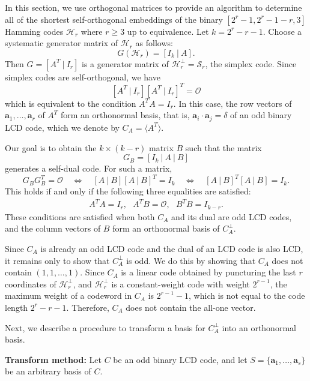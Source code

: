 \documentclass{article}
\theoremstyle{definition}
\theoremstyle{remark}
\begin{document}
In this section, we use orthogonal matrices to provide an algorithm to determine all of the shortest self-orthogonal embeddings of the binary $[2^r-1, 2^r-1-r,3]$ Hamming codes $\mathcal{H}_r$ where $r\ge 3$ up to equivalence.  Let $k=2^r-r-1$. Choose a systematic generator matrix of $\mathcal{H}_r$ as follows:
\[
G(\mathcal{H}_r)=[I_k~|~A].
\]
Then $ G = [A^T~|~ I_r]$ is a generator matrix of $\mathcal{H}_r^\perp = \mathcal{S}_r$, the simplex code.
Since simplex codes are self-orthogonal, we have
\[
  [A^T~|~ I_r][A^T~|~ I_r]^T=\mathcal{O}
\]
which is equivalent to the condition $A^TA=I_r$. In this case, the row vectors of $\mathbf{a}_1, \ldots, \mathbf{a}_r$ of $A^T$ form an orthonormal basis, that is, $\mathbf{a}_i\cdot\mathbf{a}_j=\delta$ of an odd binary LCD code, which we denote by $C_A=\langle A^T\rangle$.

Our goal is to obtain the $k\times (k-r)$ matrix $B$ such that the matrix
\begin{equation}\label{gen-mat-emb}
G_B=[I_k~|~A~|~B]
\end{equation}
generates a self-dual code. For such a matrix,
\[
  G_BG_B^T=\mathcal{O} \quad\Longleftrightarrow\quad [A~|~B][A~|~B]^T = I_k
  \quad\Longleftrightarrow\quad [A~|~B]^T[A~|~B]= I_k.
\]
This holds if and only if the following three equalities are satisfied:
\begin{align}\label{con-B}
  A^TA=I_r, \ \ \ A^T B=\mathcal{O}, \ \ \ B^T B=I_{k-r}.
\end{align}
These conditions are satisfied when both $C_A$ and its dual are odd LCD codes, and
the column vectors of $B$ form an orthonormal basis of $C_A^{\perp}$.

Since $C_A$ is already an odd LCD code and the dual of an LCD code is also LCD, it remains only to show that $C_A^\perp$ is odd. We do this by showing that $C_A$ does not contain $(1,1,\ldots, 1)$.  Since $C_A$ is a linear code obtained by puncturing the last $r$ coordinates of $\mathcal{H}_r^\perp$, and $\mathcal{H}_r^\perp$ is a constant-weight code with weight $2^{r-1}$, the maximum weight of a codeword in $C_A$ is $2^{r-1}-1$, which is not equal to the code length $2^r-r-1$.  Therefore, $C_A$ does not contain the all-one vector.

Next, we describe a procedure to transform a basis for $C_A^\perp$ into an orthonormal basis.

\textbf{Transform method:}
Let $ C $ be an odd binary LCD code, and let $ S = \{\bm{a}_1, \ldots, \bm{a}_s\} $ be an arbitrary basis of $ C $.
\end{document}
